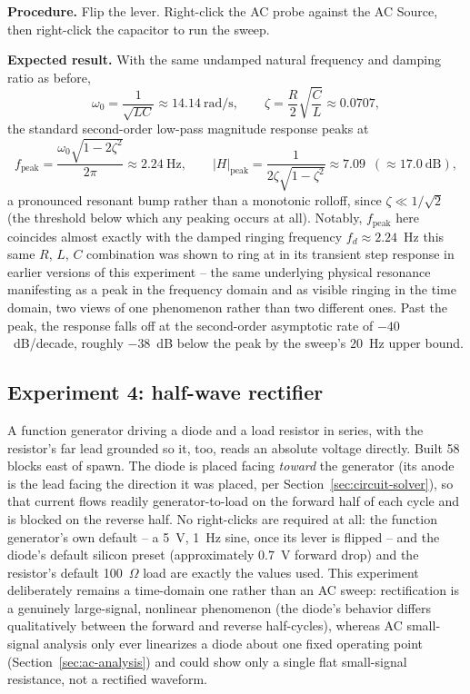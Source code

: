 \textbf{Procedure.} Flip the lever. Right-click the AC probe against the AC Source, then
right-click the capacitor to run the sweep.

\textbf{Expected result.} With the same undamped natural frequency and damping ratio as
before,
\begin{equation}
\omega_0 = \frac{1}{\sqrt{LC}} \approx 14.14~\text{rad/s}, \qquad
\zeta = \frac{R}{2}\sqrt{\frac{C}{L}} \approx 0.0707,
\end{equation}
the standard second-order low-pass magnitude response peaks at
\begin{equation}
f_{\text{peak}} = \frac{\omega_0\sqrt{1-2\zeta^2}}{2\pi} \approx 2.24~\text{Hz}, \qquad
|H|_{\text{peak}} = \frac{1}{2\zeta\sqrt{1-\zeta^2}} \approx 7.09~\;(\approx 17.0~\text{dB}),
\end{equation}
a pronounced resonant bump rather than a monotonic rolloff, since $\zeta \ll 1/\sqrt{2}$
(the threshold below which any peaking occurs at all). Notably, $f_{\text{peak}}$ here
coincides almost exactly with the damped ringing frequency $f_d \approx 2.24$~Hz this same
$R$, $L$, $C$ combination was shown to ring at in its transient step response in earlier
versions of this experiment -- the same underlying physical resonance manifesting as a peak
in the frequency domain and as visible ringing in the time domain, two views of one
phenomenon rather than two different ones. Past the peak, the response falls off at the
second-order asymptotic rate of $-40$~dB/decade, roughly $-38$~dB below the peak by the
sweep's $20$~Hz upper bound.

\subsection{Experiment 4: half-wave rectifier}
\label{sec:exp-rectifier}

A function generator driving a diode and a load resistor in series, with the resistor's far
lead grounded so it, too, reads an absolute voltage directly. Built 58 blocks east of spawn.
The diode is placed facing \emph{toward} the generator (its anode is the lead facing the
direction it was placed, per Section~\ref{sec:circuit-solver}), so that current flows readily
generator-to-load on the forward half of each cycle and is blocked on the reverse half. No
right-clicks are required at all: the function generator's own default -- a 5~V, 1~Hz sine,
once its lever is flipped -- and the diode's default silicon preset (approximately 0.7~V
forward drop) and the resistor's default 100~$\Omega$ load are exactly the values used. This
experiment deliberately remains a time-domain one rather than an AC sweep: rectification is a
genuinely large-signal, nonlinear phenomenon (the diode's behavior differs qualitatively
between the forward and reverse half-cycles), whereas AC small-signal analysis only ever
linearizes a diode about one fixed operating point (Section~\ref{sec:ac-analysis}) and could
show only a single flat small-signal resistance, not a rectified waveform.

